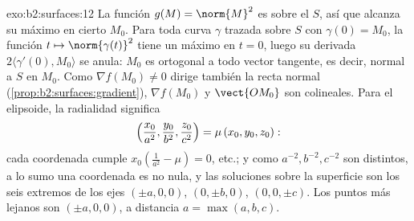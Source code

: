 \begin{solution}{exo:b2:surfaces:12}
La función $g(M) = \norm{M}^2$ es  sobre el  $S$, así
que alcanza su máximo en cierto $M_0$. Para toda curva $\gamma$
trazada sobre $S$ con $\gamma(0) = M_0$, la función $t \mapsto
\norm{\gamma(t)}^2$ tiene un máximo en $t = 0$, luego su derivada
$2\langle\gamma'(0), M_0\rangle$ se anula: $M_0$ es ortogonal a todo
vector tangente, es decir, normal a $S$ en $M_0$. Como $\nabla
f(M_0) \neq 0$ dirige también la recta normal
(\cref{prop:b2:surfaces:gradient}), $\nabla f(M_0)$ y $\vect{OM_0}$
son colineales. Para el elipsoide, la radialidad significa
\[
\Bigl(\frac{x_0}{a^2}, \frac{y_0}{b^2},
\frac{z_0}{c^2}\Bigr) = \mu\,(x_0, y_0, z_0) :
\]
cada coordenada cumple $x_0(\frac1{a^2} - \mu) = 0$, etc.; y como
$a^{-2}, b^{-2}, c^{-2}$ son distintos, a lo sumo una coordenada es
no nula, y las soluciones sobre la superficie son los seis extremos
de los ejes $(\pm a, 0, 0)$, $(0, \pm b, 0)$, $(0, 0, \pm c)$. Los
puntos más lejanos son $(\pm a, 0, 0)$, a distancia $a = \max(a,b,c)$.
\end{solution}

